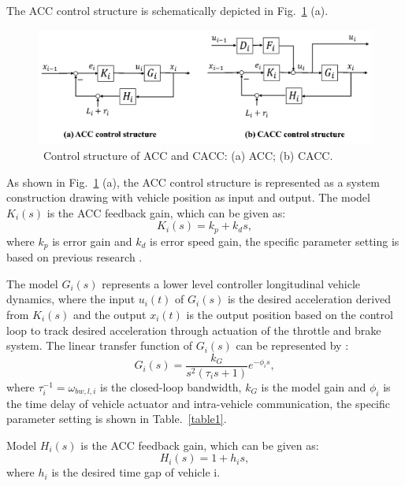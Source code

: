 \documentclass[trsc,nonblindrev]{informs3} %
\begin{document}
The ACC control structure is schematically depicted in Fig.~\ref{fig2} (a).

\begin{figure}
    \centering
    \includegraphics[width=12cm]{figs/fig2.png}
    \caption{~Control structure of ACC and CACC: (a) ACC; (b) CACC.}
    \label{fig2}

\end{figure}

As shown in Fig.~\ref{fig2} (a), the ACC control structure is represented as a system construction drawing with vehicle position as input and output. The model $K_i (s)$ is the ACC feedback gain, which can be given as:
\begin{equation}
    K_{i}(s)=k_{p}+k_{d} s,
\end{equation}
where $k_p$ is error gain and $k_d$ is error speed gain, the specific parameter setting is based on previous research \citep{milanes2014modeling,milanes2013cooperative}.

The model $G_i (s)$ represents a lower level controller longitudinal vehicle dynamics, where the input $u_i (t)$ of $G_i (s)$ is the desired acceleration derived from $K_i (s)$ and the output $x_i (t)$ is the output position based on the control loop to track desired acceleration through actuation of the throttle and brake system. The linear transfer function of $G_i (s)$ can be represented by \citep{ploeg2013lp}:
\begin{equation}
    G_{i}(s)=\frac{k_{G}}{s^{2}\left(\tau_{i} s+1\right)} e^{-\phi_{i} s},
\end{equation}
where $\tau_{i}^{-1}=\omega_{b w, l, i}$ is the closed-loop bandwidth, $k_G$ is the model gain and $\phi_{i}$ is the time delay of vehicle actuator and intra-vehicle
communication, the specific parameter setting is shown in Table.~\ref{table1}.

Model $H_i (s)$ is the ACC feedback gain, which can be given as:
\begin{equation}
    H_{i}(s)=1+h_{i} s,
\end{equation}
where $h_i$ is the desired time gap of vehicle i.
\end{document}
